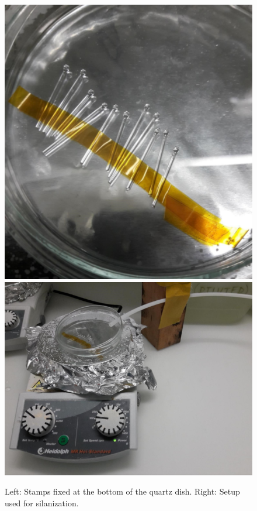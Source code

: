 \begin{figure}[H]
	\includegraphics[scale=0.4]{source/stamps_taped_compressed}
	\includegraphics[scale=0.4]{source/silanization_compressed}
	\caption{Left: Stamps fixed at the bottom of the quartz dish. Right: Setup used for silanization.}
	\label{Fig:silanization}
\end{figure}
